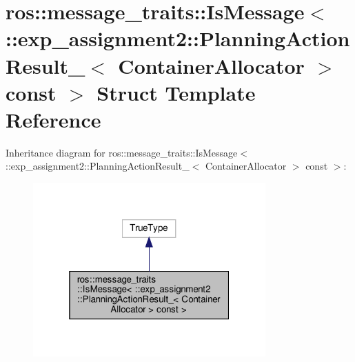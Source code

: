 \hypertarget{structros_1_1message__traits_1_1IsMessage_3_01_1_1exp__assignment2_1_1PlanningActionResult___3_07d907ce71e46a78f9bff4b169a622740}{}\section{ros\+:\+:message\+\_\+traits\+:\+:Is\+Message$<$ \+:\+:exp\+\_\+assignment2\+:\+:Planning\+Action\+Result\+\_\+$<$ Container\+Allocator $>$ const $>$ Struct Template Reference}
\label{structros_1_1message__traits_1_1IsMessage_3_01_1_1exp__assignment2_1_1PlanningActionResult___3_07d907ce71e46a78f9bff4b169a622740}


Inheritance diagram for ros\+:\+:message\+\_\+traits\+:\+:Is\+Message$<$ \+:\+:exp\+\_\+assignment2\+:\+:Planning\+Action\+Result\+\_\+$<$ Container\+Allocator $>$ const $>$\+:
\nopagebreak
\begin{figure}[H]
\begin{center}
\leavevmode
\includegraphics[width=253pt]{structros_1_1message__traits_1_1IsMessage_3_01_1_1exp__assignment2_1_1PlanningActionResult___3_0ab59fa851fc26688872c4e375149c169}
\end{center}
\end{figure}


